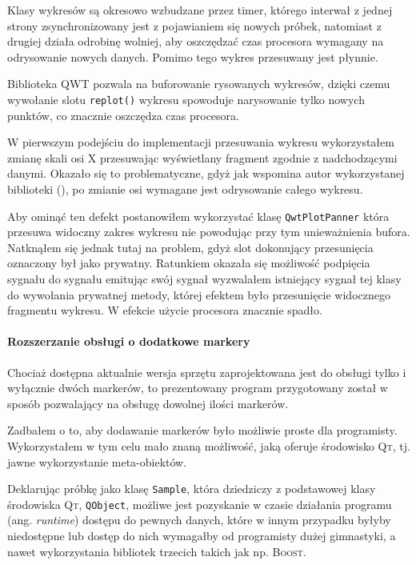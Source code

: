 Klasy wykresów są okresowo wzbudzane przez timer, którego interwał z jednej strony zsynchronizowany jest z pojawianiem się nowych próbek, natomiast z drugiej działa odrobinę wolniej, aby oszczędzać czas procesora wymagany na odrysowanie nowych danych. Pomimo tego wykres przesuwany jest płynnie.

Biblioteka \textsc{QWT} pozwala na buforowanie rysowanych wykresów, dzięki czemu wywołanie slotu \verb|replot()| wykresu spowoduje narysowanie tylko nowych punktów, co znacznie oszczędza czas procesora.

W pierwszym podejściu do implementacji przesuwania wykresu wykorzystałem zmianę skali osi X przesuwając wyświetlany fragment zgodnie z nadchodzącymi danymi. Okazało się to problematyczne, gdyż jak wspomina autor wykorzystanej biblioteki (\citep{UweRathmannNewsgroup}), po zmianie osi wymagane jest odrysowanie całego wykresu.

Aby ominąć ten defekt postanowiłem wykorzystać klasę \verb|QwtPlotPanner| która przesuwa widoczny zakres wykresu nie powodując przy tym unieważnienia bufora. Natknąłem się jednak tutaj na problem, gdyż slot dokonujący przesunięcia oznaczony był jako prywatny. Ratunkiem okazała się możliwość podpięcia sygnału do sygnału \ppauza emitując swój sygnał wyzwalałem istniejący sygnał tej klasy do wywołania prywatnej metody, której efektem było przesunięcie widocznego fragmentu wykresu. W efekcie użycie procesora znacznie spadło.

\paragraph{Rozszerzanie obsługi o dodatkowe markery}
Chociaż dostępna aktualnie wersja sprzętu zaprojektowana jest do obsługi tylko i wyłącznie dwóch markerów, to prezentowany program przygotowany został w sposób pozwalający na obsługę dowolnej ilości markerów.

Zadbałem o to, aby dodawanie markerów było możliwie proste dla programisty. Wykorzystałem w tym celu mało znaną możliwość, jaką oferuje środowisko \textsc{Qt}, tj. jawne wykorzystanie meta-obiektów.

Deklarując próbkę jako klasę \verb|Sample|, która dziedziczy z podstawowej klasy środowiska \textsc{Qt}, \verb|QObject|, możliwe jest pozyskanie w czasie działania programu (ang. \textsl{runtime}) dostępu do pewnych danych, które w innym przypadku byłyby niedostępne lub dostęp do nich wymagałby od programisty dużej gimnastyki, a nawet wykorzystania bibliotek trzecich takich jak np. \textsc{Boost}.

